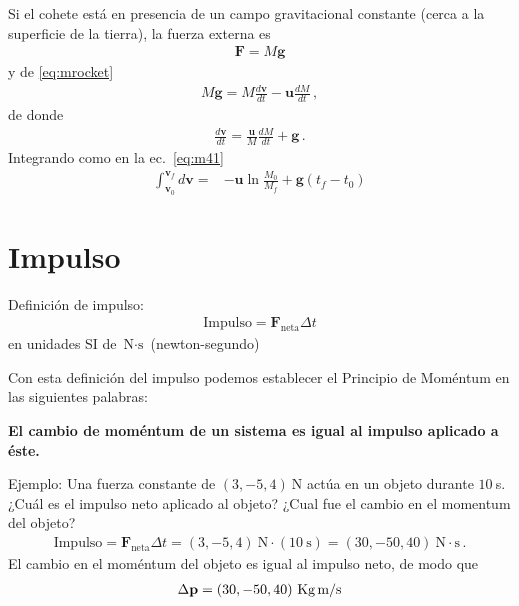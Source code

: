 Si el cohete está en presencia de un campo gravitacional constante (cerca a la superficie de la tierra), la fuerza externa es
\begin{align}
  \mathbf{F}=M\mathbf{g}
\end{align}
y de \eqref{eq:mrocket}
\begin{align}
     M\mathbf{g}=M\frac{d\mathbf{v}}{dt}-\mathbf{u}\frac{dM}{dt}\,,
\end{align}
de donde
\begin{align}
  \frac{d\mathbf{v}}{dt}=\frac{\mathbf{u}}{M}\frac{dM}{dt}+\mathbf{g}\,.
\end{align}
Integrando como en la ec.~\eqref{eq:m41}
\begin{align}
   \int_{\mathbf{v}_0}^{\mathbf{v}_f}{d\mathbf{v}}=&
   -\mathbf{u}\ln\frac{M_0}{M_f}+\mathbf{g}(t_f-t_0)
\end{align}






\section{Impulso}
\begin{frame}
{Definición de impulso:}
\begin{align}
  \text{Impulso}=\mathbf{F}_{\text{neta}}\Delta t
\end{align}
en unidades SI de $\text{N}\cdot\text{s}$ (newton-segundo)
\end{frame}

Con esta definición del impulso podemos establecer el Principio de Moméntum en las siguientes palabras:
\begin{frame}
  \begin{center}
    \textbf{El cambio de moméntum de un sistema es igual al impulso aplicado a éste.}
  \end{center}
\end{frame}

Ejemplo: Una fuerza constante de $(3,-5,4)\ $N actúa en un objeto durante $10\ $s. ¿Cuál es el impulso neto aplicado al objeto? ¿Cual fue el cambio en el momentum del objeto?
\begin{align}
\text{Impulso}=\mathbf{F}_{\text{neta}}\Delta t=(3,-5,4)\ \text{N}\cdot (10\ \text{s})=
(30,-50,40)\ \text{N}\cdot\text{s}\,.
\end{align}
El cambio en el moméntum del objeto es igual al impulso neto, de modo que
\begin{align}
  \Delta \mathbf{p}=(30,-50,40)\ \text{Kg\,m/s}
\end{align}


